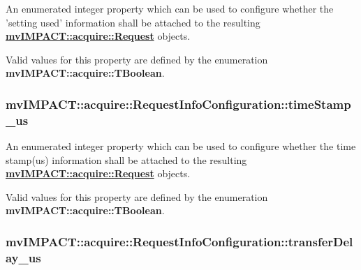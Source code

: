 An enumerated integer property which can be used to configure whether the 'setting used' information shall be attached to the resulting {\bfseries \hyperlink{classmv_i_m_p_a_c_t_1_1acquire_1_1_request}{mv\+I\+M\+P\+A\+C\+T\+::acquire\+::\+Request}} objects. 

Valid values for this property are defined by the enumeration {\bfseries mv\+I\+M\+P\+A\+C\+T\+::acquire\+::\+T\+Boolean}. \hypertarget{classmv_i_m_p_a_c_t_1_1acquire_1_1_request_info_configuration_a2124f5ba9dc92108fcdb6fe83dd2b9f5}{
\subsubsection[{time\+Stamp\+\_\+us}]{ mv\+I\+M\+P\+A\+C\+T\+::acquire\+::\+Request\+Info\+Configuration\+::time\+Stamp\+\_\+us}}\label{classmv_i_m_p_a_c_t_1_1acquire_1_1_request_info_configuration_a2124f5ba9dc92108fcdb6fe83dd2b9f5}


An enumerated integer property which can be used to configure whether the time stamp(us) information shall be attached to the resulting {\bfseries \hyperlink{classmv_i_m_p_a_c_t_1_1acquire_1_1_request}{mv\+I\+M\+P\+A\+C\+T\+::acquire\+::\+Request}} objects. 

Valid values for this property are defined by the enumeration {\bfseries mv\+I\+M\+P\+A\+C\+T\+::acquire\+::\+T\+Boolean}. \hypertarget{classmv_i_m_p_a_c_t_1_1acquire_1_1_request_info_configuration_abd2890ec09751a998abfee51e5d577fc}{
\subsubsection[{transfer\+Delay\+\_\+us}]{ mv\+I\+M\+P\+A\+C\+T\+::acquire\+::\+Request\+Info\+Configuration\+::transfer\+Delay\+\_\+us}}\label{classmv_i_m_p_a_c_t_1_1acquire_1_1_request_info_configuration_abd2890ec09751a998abfee51e5d577fc}


